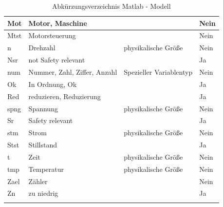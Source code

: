 \begin{longtable}{|l|l|l|l|}
Mot                & Motor, Maschine              &                         & Nein          \\ \hline
Mtst               & Motorsteuerung               &                         & Nein          \\ \hline
n                  & Drehzahl                     & physikalische Größe     & Nein          \\ \hline
Nsr                & not Safety relevant          &                         & Ja            \\ \hline
num                & Nummer, Zahl, Ziffer, Anzahl & Spezieller Variablentyp & Nein          \\ \hline
Ok                 & In Ordnung, Ok               &                         & Ja            \\ \hline
Red                & reduzieren, Reduzierung      &                         & Ja            \\ \hline
spng               & Spannung                     & physikalische Größe     & Nein          \\ \hline
Sr                 & Safety relevant              &                         & Ja            \\ \hline
stm                & Strom                        & physikalische Größe     & Nein          \\ \hline
Stst               & Stillstand                   &                         & Ja            \\ \hline
t                  & Zeit                         & physikalische Größe     & Nein          \\ \hline
tmp                & Temperatur                   & physikalische Größe     & Nein          \\ \hline
Zael               & Zähler                       &                         & Nein          \\ \hline
Zn                 & zu niedrig                   &                         & Ja            \\ \hline
\caption{Abkürzungsverzeichnis Matlab - Modell}
\label{tab_Namen_Matlab}\\
\end{longtable}